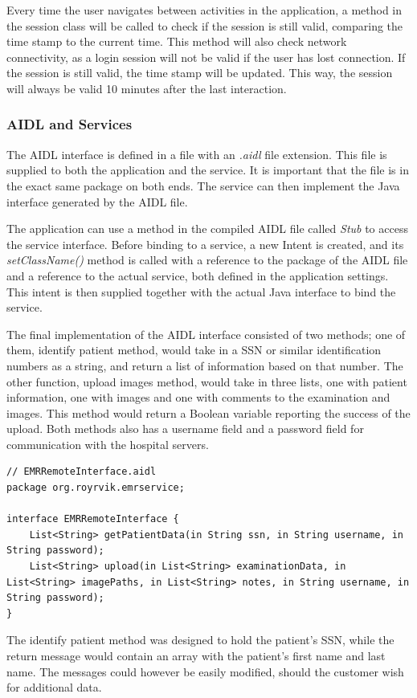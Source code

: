 Every time the user navigates between activities in the application, a method in the session class will be called to check if the session is still valid, comparing the time stamp to the current time. This method will also check network connectivity, as a login session will not be valid if the user has lost connection. If the session is still valid, the time stamp will be updated. This way, the session will always be valid 10 minutes after the last interaction.

\subsubsection{AIDL and Services}

The AIDL interface is defined in a file with an \emph{.aidl} file extension. This file is supplied to both the application and the service. It is important that the file is in the exact same package on both ends. The service can then implement the Java interface generated by the AIDL file.

The application can use a method in the compiled AIDL file called \emph{Stub} to access the service interface. Before binding to a service, a new Intent is created, and its \emph{setClassName()} method is called with a reference to the package of the AIDL file and a reference to the actual service, both defined in the application settings. This intent is then supplied together with the actual Java interface to bind the service.

The final implementation of the AIDL interface consisted of two methods; one of them, identify patient method, would take in a SSN or similar identification numbers as a string, and return a list of information based on that number. The other function, upload images method, would take in three lists, one with patient information, one with images and one with comments to the examination and images. This method would return a Boolean variable reporting the success of the upload. Both methods also has a username field and a password field for communication with the hospital servers.
\begin{lstlisting}[caption={AIDL Interface}, label={lst:finalaidlinterface}]
// EMRRemoteInterface.aidl
package org.royrvik.emrservice;

interface EMRRemoteInterface {
    List<String> getPatientData(in String ssn, in String username, in String password);
    List<String> upload(in List<String> examinationData, in List<String> imagePaths, in List<String> notes, in String username, in String password);
}
\end{lstlisting}
\smallskip
The identify patient method was designed to hold the patient's SSN, while the return message would contain an array with the patient's first name and last name. The messages could however be easily modified, should the customer wish for additional data.

